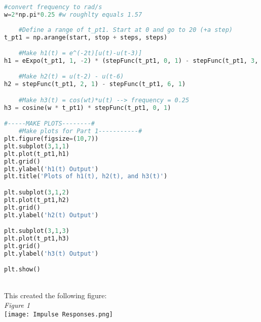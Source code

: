 \documentclass[12pt,a4paper]{article}
\begin{document}
\begin{lstlisting}[language=Python]
    #convert frequency to rad/s
w=2*np.pi*0.25 #w roughlty equals 1.57
    
    #Define a range of t_pt1. Start at 0 and go to 20 (+a step)
t_pt1 = np.arange(start, stop + steps, steps)

    #Make h1(t) = e^(-2t)[u(t)-u(t-3)]
h1 = eExpo(t_pt1, 1, -2) * (stepFunc(t_pt1, 0, 1) - stepFunc(t_pt1, 3, 1))

    #Make h2(t) = u(t-2) - u(t-6)
h2 = stepFunc(t_pt1, 2, 1) - stepFunc(t_pt1, 6, 1)

    #Make h3(t) = cos(wt)*u(t) --> frequency = 0.25
h3 = cosine(w * t_pt1) * stepFunc(t_pt1, 0, 1)

#-----MAKE PLOTS--------#
    #Make plots for Part 1-----------#
plt.figure(figsize=(10,7))
plt.subplot(3,1,1)
plt.plot(t_pt1,h1)
plt.grid()
plt.ylabel('h1(t) Output')
plt.title('Plots of h1(t), h2(t), and h3(t)')

plt.subplot(3,1,2)
plt.plot(t_pt1,h2)
plt.grid()
plt.ylabel('h2(t) Output')

plt.subplot(3,1,3)
plt.plot(t_pt1,h3)
plt.grid()
plt.ylabel('h3(t) Output')

plt.show()
\end{lstlisting}
\\
This created the following figure:
\\
\textit{Figure 1}
\\
\texttt{[image: Impulse Responses.png]}
\newpage
\end{document}
